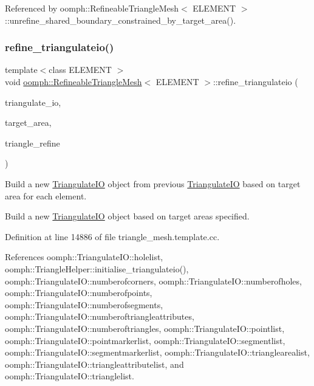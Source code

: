 Referenced by oomph\+::\+Refineable\+Triangle\+Mesh$<$ E\+L\+E\+M\+E\+N\+T $>$\+::unrefine\+\_\+shared\+\_\+boundary\+\_\+constrained\+\_\+by\+\_\+target\+\_\+area().

\mbox{\label{classoomph_1_1RefineableTriangleMesh_aad5cd84d53d6a902a47fda4bcc734e40}} 
\subsubsection{\texorpdfstring{refine\+\_\+triangulateio()}{refine\_triangulateio()}}
{\footnotesize\ttfamily template$<$class E\+L\+E\+M\+E\+NT $>$ \\
void \hyperlink{classoomph_1_1RefineableTriangleMesh}{oomph\+::\+Refineable\+Triangle\+Mesh}$<$ E\+L\+E\+M\+E\+NT $>$\+::refine\+\_\+triangulateio (\begin{DoxyParamCaption}\item[{\hyperlink{structoomph_1_1TriangulateIO}{Triangulate\+IO} \&}]{triangulate\+\_\+io,  }\item[{const \hyperlink{classoomph_1_1Vector}{Vector}$<$ double $>$ \&}]{target\+\_\+area,  }\item[{\hyperlink{structoomph_1_1TriangulateIO}{Triangulate\+IO} \&}]{triangle\+\_\+refine }\end{DoxyParamCaption})\hspace{0.3cm}{\ttfamily [protected]}}



Build a new \hyperlink{structoomph_1_1TriangulateIO}{Triangulate\+IO} object from previous \hyperlink{structoomph_1_1TriangulateIO}{Triangulate\+IO} based on target area for each element. 

Build a new \hyperlink{structoomph_1_1TriangulateIO}{Triangulate\+IO} object based on target areas specified. 

Definition at line 14886 of file triangle\+\_\+mesh.\+template.\+cc.



References oomph\+::\+Triangulate\+I\+O\+::holelist, oomph\+::\+Triangle\+Helper\+::initialise\+\_\+triangulateio(), oomph\+::\+Triangulate\+I\+O\+::numberofcorners, oomph\+::\+Triangulate\+I\+O\+::numberofholes, oomph\+::\+Triangulate\+I\+O\+::numberofpoints, oomph\+::\+Triangulate\+I\+O\+::numberofsegments, oomph\+::\+Triangulate\+I\+O\+::numberoftriangleattributes, oomph\+::\+Triangulate\+I\+O\+::numberoftriangles, oomph\+::\+Triangulate\+I\+O\+::pointlist, oomph\+::\+Triangulate\+I\+O\+::pointmarkerlist, oomph\+::\+Triangulate\+I\+O\+::segmentlist, oomph\+::\+Triangulate\+I\+O\+::segmentmarkerlist, oomph\+::\+Triangulate\+I\+O\+::trianglearealist, oomph\+::\+Triangulate\+I\+O\+::triangleattributelist, and oomph\+::\+Triangulate\+I\+O\+::trianglelist.

